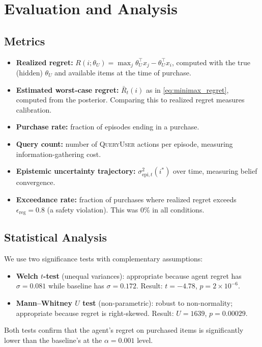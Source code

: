 \documentclass[11pt,letterpaper]{article}
\newcommand{\QueryUser}{\textsc{QueryUser}}
\newcommand{\thetaU}{\theta_U}
\newcommand{\epsreg}{\epsilon_{\mathrm{reg}}}
\newcommand{\Rbar}{\bar{R}}
\begin{document}
\section{Evaluation and Analysis}
\label{sec:analysis}

\subsection{Metrics}

\begin{itemize}[nosep]
    \item \textbf{Realized regret:} $R(i; \thetaU) = \max_j \thetaU^\top x_j - \thetaU^\top x_i$, computed with the true (hidden) $\thetaU$ and available items at the time of purchase.
    \item \textbf{Estimated worst-case regret:} $\Rbar_t(i)$ as in \cref{eq:minimax_regret}, computed from the posterior.  Comparing this to realized regret measures calibration.
    \item \textbf{Purchase rate:} fraction of episodes ending in a purchase.
    \item \textbf{Query count:} number of \QueryUser{} actions per episode, measuring information-gathering cost.
    \item \textbf{Epistemic uncertainty trajectory:} $\sigma_{\mathrm{epi},t}^2(i^*)$ over time, measuring belief convergence.
    \item \textbf{Exceedance rate:} fraction of purchases where realized regret exceeds $\epsreg = 0.8$ (a safety violation).  This was 0\% in all conditions.
\end{itemize}

\subsection{Statistical Analysis}

We use two significance tests with complementary assumptions:
\begin{itemize}[nosep]
    \item \textbf{Welch $t$-test} (unequal variances): appropriate because agent regret has $\sigma = 0.081$ while baseline has $\sigma = 0.172$.  Result: $t = -4.78$, $p = 2 \times 10^{-6}$.
    \item \textbf{Mann--Whitney $U$ test} (non-parametric): robust to non-normality; appropriate because regret is right-skewed.  Result: $U = 1639$, $p = 0.00029$.
\end{itemize}
Both tests confirm that the agent's regret on purchased items is significantly lower than the baseline's at the $\alpha = 0.001$ level.
\end{document}
